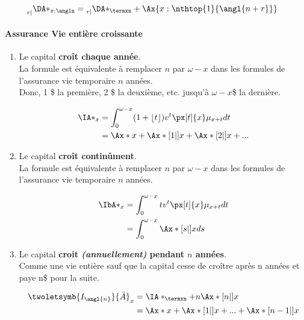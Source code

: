 \documentclass[10pt, french]{article}
\begin{document}
\begin{multicols*}{3}
\begin{align*}
	\prescript{}{r|}{\DA*_{x:\angln}} &= \prescript{}{r|}{\DA*_{\termxn}} + \Ax{x:\nthtop{1}{\angl{n + r}}}
\end{align*}

\paragraph{Assurance Vie entière croissante}

\begin{enumerate}

\item[] Le capital \textbf{croît chaque année}. \\
La formule est équivalente à remplacer $n$ par $\omega - x$ dans les formules de l'assurance vie temporaire $n$ années.\\ 
Donc, 1 \$ la première, 2 \$ la deuxième, etc. jusqu'à \textbf{$\omega - x$}\$ la dernière.

\begin{align*}
	\IA*_{x} &= \int_0^{\omega - x} (1 + \lfloor t \rfloor) v^t \px[t]{x} \mu_{x+t} dt \\
		&= \Ax*{x} + \Ax*[1|]{x} + \Ax*[2|]{x} + ...
\end{align*}

\item[] Le capital \textbf{croît continûment}. \\
La formule est équivalente à remplacer $n$ par $\omega - x$ dans les formules de l'assurance vie temporaire $n$ années.

\begin{align*}
	\IbA*_x &= \int_0^{\omega - x} t v^t \px[t]{x} \mu_{x+t} dt \\
		&= \int_0^{\omega - x} \Ax*[s|]{x} ds 
\end{align*}

\item[] Le capital \textbf{croit \textit{(annuellement)} pendant $n$ années}.\\
Comme une vie entière sauf que la capital cesse de croître après n années et paye n\$ pour la suite.

\begin{align*}
	\twoletsymb{I_{\angl{n}}}{\bar{A}}_{x} 
	&= \IA*_{\termxn} + n \Ax*[n|]{x}\\
	&= \Ax*{x} + \Ax*[1|]{x} + ... + \Ax*[n-1|]{x}
\end{align*}


\end{enumerate}
\end{multicols*}
\end{document}
